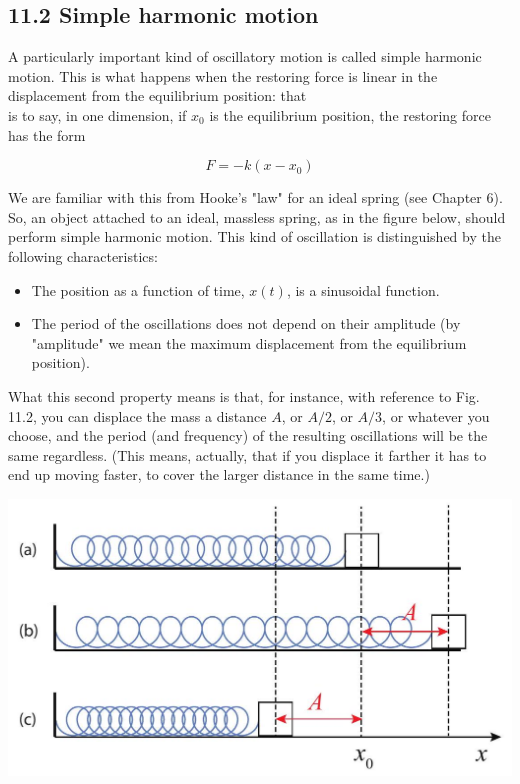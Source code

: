 \documentclass[10pt]{article}
\begin{document}
\subsection*{11.2 Simple harmonic motion}
A particularly important kind of oscillatory motion is called simple harmonic motion. This is what happens when the restoring force is linear in the displacement from the equilibrium position: that\\
is to say, in one dimension, if $x_{0}$ is the equilibrium position, the restoring force has the form


\begin{equation*}
F=-k\left(x-x_{0}\right) \tag{11.2}
\end{equation*}


We are familiar with this from Hooke's "law" for an ideal spring (see Chapter 6). So, an object attached to an ideal, massless spring, as in the figure below, should perform simple harmonic motion. This kind of oscillation is distinguished by the following characteristics:

\begin{itemize}
  \item The position as a function of time, $x(t)$, is a sinusoidal function.
  \item The period of the oscillations does not depend on their amplitude (by "amplitude" we mean the maximum displacement from the equilibrium position).
\end{itemize}

What this second property means is that, for instance, with reference to Fig. 11.2, you can displace the mass a distance $A$, or $A / 2$, or $A / 3$, or whatever you choose, and the period (and frequency) of the resulting oscillations will be the same regardless. (This means, actually, that if you displace it farther it has to end up moving faster, to cover the larger distance in the same time.)

\begin{center}
\includegraphics[max width=\textwidth]{2024_09_14_9969b06773f10b6936e8g-273}
\end{center}
\end{document}
